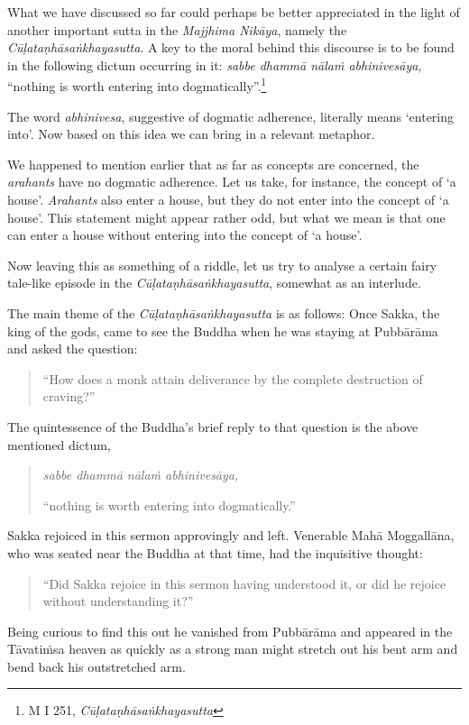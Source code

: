 What we have discussed so far could perhaps be better appreciated in the light of another important sutta in the \emph{Majjhima Nikāya}, namely the \emph{Cūḷataṇhāsaṅkhayasutta}. A key to the moral behind this discourse is to be found in the following dictum occurring in it: \emph{sabbe dhammā nālaṁ abhinivesāya,} ``nothing is worth entering into dogmatically''.\footnote{M I 251, \emph{Cūḷataṇhāsaṅkhayasutta}}

The word \emph{abhinivesa}, suggestive of dogmatic adherence, literally means `entering into'. Now based on this idea we can bring in a relevant metaphor.

We happened to mention earlier that as far as concepts are concerned, the \emph{arahants} have no dogmatic adherence. Let us take, for instance, the concept of `a house'. \emph{Arahants} also enter a house, but they do not enter into the concept of `a house'. This statement might appear rather odd, but what we mean is that one can enter a house without entering into the concept of `a house'.

Now leaving this as something of a riddle, let us try to analyse a certain fairy tale-like episode in the \emph{Cūḷataṇhāsaṅkhayasutta}, somewhat as an interlude.

The main theme of the \emph{Cūḷataṇhāsaṅkhayasutta} is as follows: Once Sakka, the king of the gods, came to see the Buddha when he was staying at Pubbārāma and asked the question:

\begin{quote}
``How does a monk attain deliverance by the complete destruction of craving?''
\end{quote}

The quintessence of the Buddha's brief reply to that question is the above mentioned dictum,

\begin{quote}
\emph{sabbe dhammā nālaṁ abhinivesāya,}

``nothing is worth entering into dogmatically.''
\end{quote}

Sakka rejoiced in this sermon approvingly and left. Venerable Mahā Moggallāna, who was seated near the Buddha at that time, had the inquisitive thought:

\begin{quote}
``Did Sakka rejoice in this sermon having understood it, or did he rejoice without understanding it?''
\end{quote}

Being curious to find this out he vanished from Pubbārāma and appeared in the Tāvatiṁsa heaven as quickly as a strong man might stretch out his bent arm and bend back his outstretched arm.

